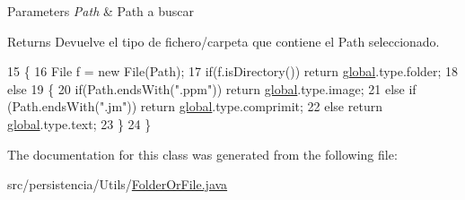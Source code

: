 \begin{DoxyParams}{Parameters}
{\em Path} & Path a buscar \\
\hline
\end{DoxyParams}
\begin{DoxyReturn}{Returns}
Devuelve el tipo de fichero/carpeta que contiene el Path seleccionado. 
\end{DoxyReturn}

\begin{DoxyCode}
15     \{
16         File f = \textcolor{keyword}{new} File(Path);
17         \textcolor{keywordflow}{if}(f.isDirectory()) \textcolor{keywordflow}{return} \hyperlink{namespaceglobal}{global}.type.folder;
18         \textcolor{keywordflow}{else}
19         \{
20             \textcolor{keywordflow}{if}(Path.endsWith(\textcolor{stringliteral}{".ppm"})) \textcolor{keywordflow}{return} \hyperlink{namespaceglobal}{global}.type.image;
21             \textcolor{keywordflow}{else} if (Path.endsWith(\textcolor{stringliteral}{".jm"})) \textcolor{keywordflow}{return} \hyperlink{namespaceglobal}{global}.type.comprimit;
22             \textcolor{keywordflow}{else} \textcolor{keywordflow}{return} \hyperlink{namespaceglobal}{global}.type.text;
23         \}
24     \}
\end{DoxyCode}


The documentation for this class was generated from the following file\+:\begin{DoxyCompactItemize}
\item 
src/persistencia/\+Utils/\hyperlink{FolderOrFile_8java}{Folder\+Or\+File.\+java}\end{DoxyCompactItemize}
